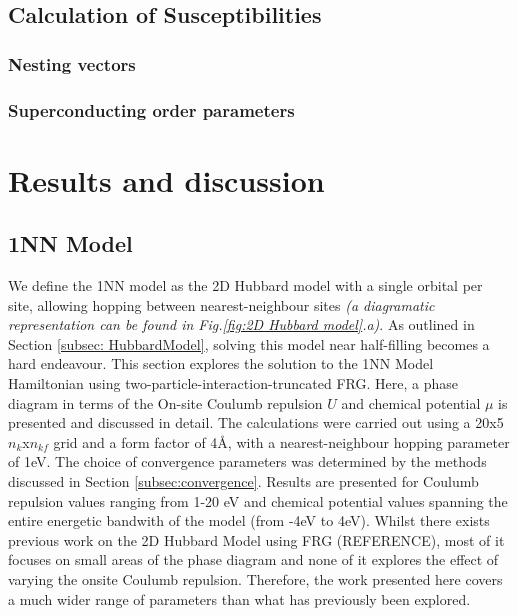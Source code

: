 \documentclass[12pt]{article}
\begin{document}
\subsection{Calculation of Susceptibilities}

\subsubsection{Nesting vectors}

\subsubsection{Superconducting order parameters}

\section{Results and discussion}

\subsection{1NN Model}
\label{subsec:1NNModel}

We define the 1NN model as the 2D Hubbard model with a single orbital per site,  allowing hopping between nearest-neighbour sites \textit{(a diagramatic representation can be found in Fig.\ref{fig:2D Hubbard model}.a)}. 
As outlined in Section \ref{subsec: HubbardModel}, solving this model near half-filling becomes a hard endeavour. 
This section explores the solution to the 1NN Model Hamiltonian using  two-particle-interaction-truncated FRG.
Here, a phase diagram in terms of the On-site Coulumb repulsion $U$ and chemical
potential $\mu$ is presented and discussed in detail. The calculations were carried out using a 20x5 $n_k$x$n_{kf}$ grid and a form factor
of 4\AA, with a  nearest-neighbour hopping parameter of 1eV.  The choice of convergence parameters was determined by the methods discussed in Section \ref{subsec:convergence}. 
Results are presented for Coulumb repulsion values  ranging from 1-20 eV and chemical potential
values spanning the entire energetic bandwith of the model (from -4eV to 4eV). 
Whilst there exists previous work on the 2D Hubbard Model using FRG (REFERENCE), most of it focuses on small areas of the phase diagram and none of it explores the effect of varying the 
onsite Coulumb repulsion. Therefore, the work presented here covers a much wider range of parameters than what has previously been explored. 
\medskip
\end{document}

